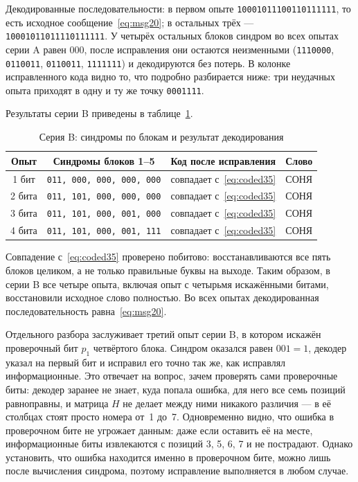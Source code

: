 \documentclass[a4paper,14pt]{extarticle}
\begin{document}
Декодированные последовательности: в первом опыте
\texttt{10001011100110111111}, то есть исходное сообщение~\eqref{eq:msg20};
в остальных трёх --- \texttt{10001011011110111111}. У четырёх остальных блоков синдром
во всех опытах серии A равен $000$, после исправления они остаются неизменными
(\texttt{1110000}, \texttt{0110011}, \texttt{0110011}, \texttt{1111111}) и
декодируются без потерь. В колонке исправленного кода видно то, что подробно
разбирается ниже: три неудачных опыта приходят в одну и ту же точку \texttt{0001111}.

Результаты серии B приведены в таблице~\ref{tab:resB}.

\begin{table}[H]
\caption{Серия B: синдромы по блокам и результат декодирования}
\label{tab:resB}
\centering\footnotesize\setlength{\tabcolsep}{7pt}
\begin{tabular}{c|c|c|c}
\toprule
Опыт & Синдромы блоков 1--5 & Код после исправления & Слово \\
\midrule
1 бит & \texttt{011, 000, 000, 000, 000} & совпадает с~\eqref{eq:coded35} & СОНЯ \\
2 бита & \texttt{011, 101, 000, 000, 000} & совпадает с~\eqref{eq:coded35} & СОНЯ \\
3 бита & \texttt{011, 101, 000, 001, 000} & совпадает с~\eqref{eq:coded35} & СОНЯ \\
4 бита & \texttt{011, 101, 000, 001, 111} & совпадает с~\eqref{eq:coded35} & СОНЯ \\
\bottomrule
\end{tabular}
\end{table}

Совпадение с~\eqref{eq:coded35} проверено побитово: восстанавливаются все пять блоков
целиком, а не только правильные буквы на выходе. Таким образом, в серии B все четыре
опыта, включая опыт с четырьмя искажёнными битами, восстановили исходное слово
полностью. Во всех опытах декодированная последовательность равна~\eqref{eq:msg20}.

Отдельного разбора заслуживает третий опыт серии B, в котором искажён проверочный бит
$p_1$ четвёртого блока. Синдром оказался равен $001 = 1$, декодер указал на первый бит
и исправил его точно так же, как исправлял информационные. Это отвечает на вопрос,
зачем проверять сами проверочные биты: декодер заранее не знает, куда попала ошибка,
для него все семь позиций равноправны, и матрица $H$ не делает между ними никакого
различия --- в её столбцах стоят просто номера от~1 до~7. Одновременно видно, что
ошибка в проверочном бите не угрожает данным: даже если оставить её на месте,
информационные биты извлекаются с позиций 3, 5, 6, 7 и не пострадают. Однако
установить, что ошибка находится именно в проверочном бите, можно лишь после вычисления
синдрома, поэтому исправление выполняется в любом случае.
\end{document}
